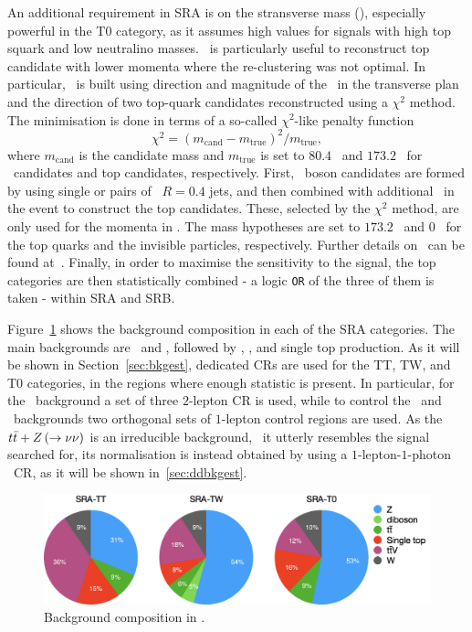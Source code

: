 				An additional requirement in SRA is on the stransverse mass (\mttwo), especially powerful in the T0 category, as it assumes high values for signals with high top squark and low neutralino masses. \mttwo\ is particularly useful to reconstruct top candidate with lower momenta where the re-clustering was not optimal. In particular, \mttwo\ is built using direction and magnitude of the \ptmiss\ in the transverse plan and the direction of two top-quark candidates reconstructed using a $\chi^2$ method. The minimisation is done in terms of a so-called $\chi^2$-like penalty function $$\chi^2 = \left(m_{\mathrm{cand}} - m_{\mathrm{true}}\right)^2 / m_{\mathrm{true}},$$ \noindent where $m_{\mathrm{cand}}$ is the candidate mass and $m_{\mathrm{true}}$ is set to $80.4$ \GeV\ and $173.2$ \GeV\ for \Wboson\ candidates and top candidates, respectively. First, \Wboson\ boson candidates are formed by using single or pairs of \antikt\ $R = 0.4$ jets, and then combined with additional \bjs\ in the event to construct the top candidates. These, selected by the $\chi^2$ method, are only used for the momenta in \mttwo. The mass hypotheses are set to $173.2$ \gev\ and $0$ \gev\ for the top quarks and the invisible particles, respectively.	Further details on \mttwo\ can be found at~\cite{Barr:2003rg, LESTER199999}. Finally, in order to maximise the sensitivity to the signal, the top categories are then statistically combined - a logic \verb+OR+ of the three of them is taken - within SRA and SRB.

				Figure~\ref{fig:SRA_bkgcomp} shows the background composition in each of the SRA categories. The main backgrounds are \Zjets\ and \ttV, followed by \ttbar, \Wjets, and single top production. As it will be shown in Section~\ref{sec:bkgest}, dedicated \acp{CR} are used for the TT, TW, and T0 categories, in the regions where enough statistic is present. In particular, for the \Zjets\ background a set of three $2$-lepton \ac{CR} is used, while to control the \ttbar\ and \Wjets\ backgrounds two orthogonal sets of $1$-lepton control regions are used. As the $t\bar{t}+Z \left ( \rightarrow \nu\nu\right)$ is an irreducible background, \ie\ it utterly resembles the signal searched for, its normalisation is instead obtained by using a $1$-lepton-$1$-photon \ttgamma\ \ac{CR}, as it will be shown in~\ref{sec:ddbkgest}.

				\begin{figure}[t]
				  \begin{center}
				   \includegraphics[width=\textwidth]{figures/stop/piechart_SRAcomp}
				   \caption{Background composition in \SRA.}
				   \label{fig:SRA_bkgcomp}
				  \end{center}
				\end{figure}

